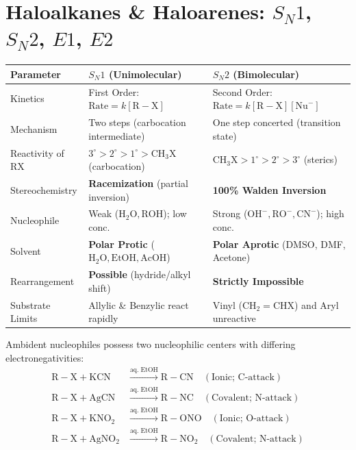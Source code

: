 \documentclass[10pt,twoside,openright]{book}
\begin{document}
\section{Haloalkanes \& Haloarenes: $S_N1$, $S_N2$, $E1$, $E2$}

\begin{formulabox}
\begin{center}
\scriptsize
\setlength{\tabcolsep}{2.5pt}
\renewcommand{\arraystretch}{1.15}
\begin{tabularx}{\linewidth}{|l|X|X|}
\hline
\textbf{Parameter} & \textbf{$S_N1$ (Unimolecular)} & \textbf{$S_N2$ (Bimolecular)} \\
\hline
Kinetics & First Order: $\text{Rate} = k[\mathrm{R-X}]$ & Second Order: $\text{Rate} = k[\mathrm{R-X}][\mathrm{Nu}^-]$ \\
Mechanism & Two steps (carbocation intermediate) & One step concerted (transition state) \\
Reactivity of $\mathrm{RX}$ & $3^\circ > 2^\circ > 1^\circ > \mathrm{CH}_3\mathrm{X}$ (carbocation) & $\mathrm{CH}_3\mathrm{X} > 1^\circ > 2^\circ > 3^\circ$ (sterics) \\
Stereochemistry & \textbf{Racemization} (partial inversion) & \textbf{100\% Walden Inversion} \\
Nucleophile & Weak ($\mathrm{H_2O, ROH}$); low conc. & Strong ($\mathrm{OH^-, RO^-, CN^-}$); high conc. \\
Solvent & \textbf{Polar Protic} ($\mathrm{H_2O, EtOH, AcOH}$) & \textbf{Polar Aprotic} (DMSO, DMF, Acetone) \\
Rearrangement & \textbf{Possible} (hydride/alkyl shift) & \textbf{Strictly Impossible} \\
Substrate Limits & Allylic \& Benzylic react rapidly & Vinyl ($\mathrm{CH_2=CHX}$) and Aryl unreactive \\
\hline
\end{tabularx}
\end{center}
\end{formulabox}

\begin{formulabox}
Ambident nucleophiles possess two nucleophilic centers with differing electronegativities:
\begin{align*}
  \mathrm{R-X} + \mathrm{KCN} &\xrightarrow{\mathrm{aq.\; EtOH}} \mathrm{R-CN} \quad (\text{Ionic; C-attack})\\
  \mathrm{R-X} + \mathrm{AgCN} &\xrightarrow{\mathrm{aq.\; EtOH}} \mathrm{R-NC} \quad (\text{Covalent; N-attack})\\
  \mathrm{R-X} + \mathrm{KNO_2} &\xrightarrow{\mathrm{aq.\; EtOH}} \mathrm{R-ONO} \quad (\text{Ionic; O-attack})\\
  \mathrm{R-X} + \mathrm{AgNO_2} &\xrightarrow{\mathrm{aq.\; EtOH}} \mathrm{R-NO_2} \quad (\text{Covalent; N-attack})
\end{align*}
\end{formulabox}
\end{document}

